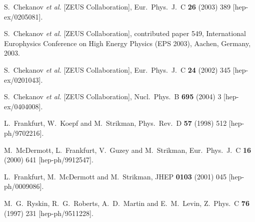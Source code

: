 \begin{thebibliography}{999}
S.~Chekanov {\it et al.}  [ZEUS Collaboration],
Eur.\ Phys.\ J.\ C {\bf 26} (2003) 389 
[hep-ex/0205081].

S.~Chekanov {\it et al.}  [ZEUS Collaboration],
contributed paper 549, International Europhysics Conference 
on High Energy Physics (EPS 2003), Aachen, Germany, 2003. 

S.~Chekanov {\it et al.}  [ZEUS Collaboration],
Eur.\ Phys.\ J.\ C {\bf 24} (2002) 345 
[hep-ex/0201043].

S.~Chekanov {\it et al.}  [ZEUS Collaboration],
Nucl.\ Phys.\ B {\bf 695} (2004) 3
[hep-ex/0404008].




L.~Frankfurt, W.~Koepf and M.~Strikman,
Phys.\ Rev.\ D {\bf 57} (1998) 512 
[hep-ph/9702216].

M.~McDermott, L.~Frankfurt, V.~Guzey and M.~Strikman,
Eur.\ Phys.\ J.\ C {\bf 16} (2000) 641 
[hep-ph/9912547].

L.~Frankfurt, M.~McDermott and M.~Strikman,
JHEP {\bf 0103} (2001) 045 
[hep-ph/0009086].

M.~G.~Ryskin, R.~G.~Roberts, A.~D.~Martin and E.~M.~Levin,
Z.\ Phys.\ C {\bf 76} (1997) 231 
[hep-ph/9511228].


\end{thebibliography}

